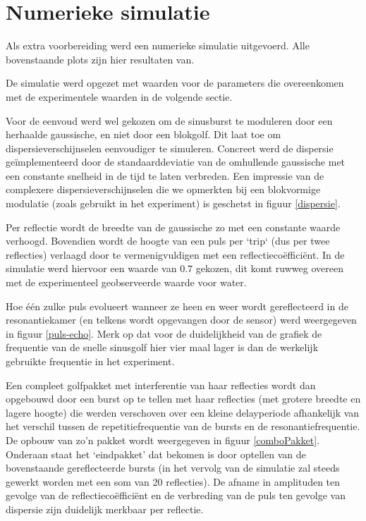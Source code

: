 \section{Numerieke simulatie}
Als extra voorbereiding werd een numerieke simulatie uitgevoerd. Alle 
bovenstaande plots zijn hier resultaten van.

De simulatie werd opgezet met waarden voor de parameters die overeenkomen 
met de experimentele waarden in de volgende sectie.

Voor de eenvoud werd wel gekozen om de sinusburst te moduleren door een 
herhaalde gaussische, en niet door een blokgolf. Dit laat toe om 
dispersieverschijnselen eenvoudiger te simuleren. Concreet werd de 
dispersie ge\"implementeerd door de standaarddeviatie van de omhullende 
gaussische met een constante snelheid in de tijd te laten verbreden. Een 
impressie van de complexere dispersieverschijnselen die we opmerkten bij 
een blokvormige modulatie (zoals gebruikt in het experiment) is geschetst 
in figuur \ref{dispersie}.

Per reflectie wordt de breedte van de gaussische zo met een constante 
waarde verhoogd. Bovendien wordt de hoogte van een puls per `trip` (dus per 
twee reflecties) verlaagd door te vermenigvuldigen met een 
reflectieco\"effici\"ent. In de simulatie werd hiervoor een waarde van 
$0.7$ gekozen, dit komt ruwweg overeen met de experimenteel geobserveerde 
waarde voor water.

Hoe \'e\'en zulke puls evolueert wanneer ze heen en weer wordt 
gereflecteerd in de resonantiekamer (en telkens wordt opgevangen door de 
sensor) werd weergegeven in figuur \ref{puls-echo}. Merk op dat voor de 
duidelijkheid van de grafiek de frequentie van de snelle sinusgolf hier 
vier maal lager is dan de werkelijk gebruikte frequentie in het experiment.

Een compleet golfpakket met interferentie van haar reflecties wordt dan 
opgebouwd door een burst op te tellen met haar reflecties (met grotere 
breedte en lagere hoogte) die werden verschoven over een kleine 
delayperiode afhankelijk van het verschil tussen de repetitiefrequentie van 
de bursts en de resonantiefrequentie. De opbouw van zo'n pakket wordt 
weergegeven in figuur \ref{comboPakket}. Onderaan staat het `eindpakket' 
dat bekomen is door optellen van de bovenstaande gereflecteerde bursts (in 
het vervolg van de simulatie zal steeds gewerkt worden met een som van 20 
reflecties). De afname in amplituden ten gevolge van de 
reflectieco\"effici\"ent en de verbreding van de puls ten gevolge van 
dispersie zijn duidelijk merkbaar per reflectie.

